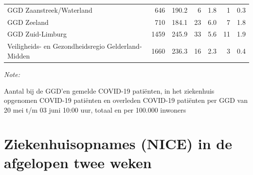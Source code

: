 \documentclass[
  english,
  man,floatsintext]{apa6}
\begin{document}
\begin{table}
\begin{threeparttable}
\begin{tabular}{lrrrrrr}
GGD Zaanstreek/Waterland & 646 & 190.2 & 6 & 1.8 & 1 & 0.3\\
GGD Zeeland & 710 & 184.1 & 23 & 6.0 & 7 & 1.8\\
GGD Zuid-Limburg & 1459 & 245.9 & 33 & 5.6 & 11 & 1.9\\
Veiligheids- en Gezondheidsregio Gelderland-Midden & 1660 & 236.3 & 16 & 2.3 & 3 & 0.4\\
\bottomrule
\end{tabular}
\begin{tablenotes}
\item \textit{Note: } 
\item Aantal bij de GGD’en gemelde COVID-19 patiënten, in het ziekenhuis opgenomen COVID-19 patiënten en overleden COVID-19 patiënten per GGD van 20 mei t/m 03 juni 10:00 uur, totaal en per 100.000 inwoners
\end{tablenotes}
\end{threeparttable}
\endgroup{}
\end{table}

\newpage

\hypertarget{ziekenhuisopnames-nice-in-de-afgelopen-twee-weken}{%
\section{Ziekenhuisopnames (NICE) in de afgelopen twee weken}\label{ziekenhuisopnames-nice-in-de-afgelopen-twee-weken}}
\end{document}
